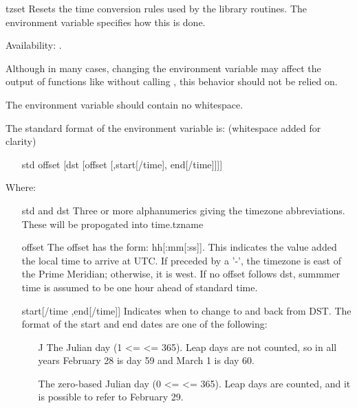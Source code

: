 \begin{funcdesc}{tzset}{}
Resets the time conversion rules used by the library routines.
The environment variable  specifies how this is done.

Availability: \UNIX.

\begin{notice}
Although in many cases, changing the  environment variable
may affect the output of functions like  without calling 
, this behavior should not be relied on.

The  environment variable should contain no whitespace.
\end{notice}

The standard format of the  environment variable is:
(whitespace added for clarity)
\begin{itemize}
    \item[std offset [dst [offset] [,start[/time], end[/time]]]]
\end{itemize}

Where:

\begin{itemize}
  \item[std and dst]
    Three or more alphanumerics giving the timezone abbreviations.
    These will be propogated into time.tzname

  \item[offset]
    The offset has the form: \plusminus hh[:mm[:ss]].
    This indicates the value added the local time to arrive at UTC. 
    If preceded by a '-', the timezone is east of the Prime 
    Meridian; otherwise, it is west. If no offset follows
    dst, summmer time is assumed to be one hour ahead of standard time.

  \item[start[/time],end[/time]]
    Indicates when to change to and back from DST. The format of the
    start and end dates are one of the following:

    \begin{itemize}
      \item[J\var{n}]
        The Julian day  (1 <=  <= 365). Leap days are not 
        counted, so in all years February 28 is day 59 and
        March 1 is day 60.

    \item[\var{n}]
        The zero-based Julian day (0 <=  <= 365). Leap days are
        counted, and it is possible to refer to February 29.


\end{itemize}
\end{itemize}
\end{funcdesc}
